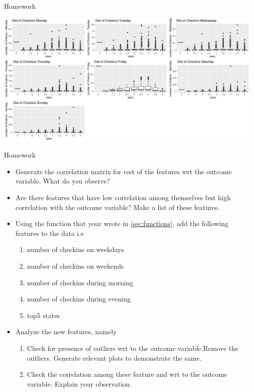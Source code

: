 \documentclass[12pt]{book}\usepackage{knitr}
\begin{document}
\begin{DIY}{Homework}
\begin{knitrout}
\begin{kframe}
{\ttfamily\noindent\color{warningcolor}{\#\# Warning: Use of `cleanedTrainingSet\$numCheckins\_Sunday` is discouraged. Use `numCheckins\_Sunday` instead.}}\end{kframe}
\includegraphics[width=\maxwidth]{figure/unnamed-chunk-47-1} 

\end{knitrout}
\end{DIY}

\begin{DIY}{Homework}
  \begin{itemize}
  \item Generate the correlation matrix for rest of the features wrt the outcome variable. What do you observe? 
  \item Are there features that have low correlation among themselves but high correlation with the outcome variable? Make a list of these features.
   \item Using the function that your wrote in \ref{sec:functions}, add the following features to the data i.e
   \begin{enumerate}
      \item number of checkins on weekdays
      \item number of checkins on weekends
      \item number of checkins during morning
      \item number of checkins during evening
      \item top5 states
   \end{enumerate}
   \item  Analyze the new features, namely
   \begin{enumerate}
        \item Check for presence of outliers wrt to the outcome variable.Remove the outliers. Generate relevant plots to demonstrate the same. 
        \item Check the correlation among these feature and wrt to the outcome variable. Explain your observation.
    \end{enumerate}
\end{itemize}
\end{DIY}
\end{document}
